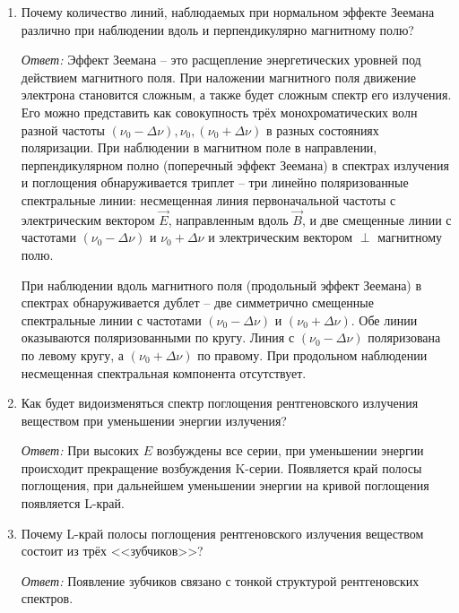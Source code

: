 \begin{enumerate}
\vspace*{1.5em}
\item Почему количество линий, наблюдаемых при нормальном эффекте Зеемана
различно при наблюдении вдоль и перпендикулярно магнитному полю?

\emph{Ответ:}
Эффект Зеемана -- это расщепление энергетических уровней под действием
магнитного поля. При наложении магнитного поля движение электрона становится
сложным, а также будет сложным спектр его излучения. Его можно представить как
совокупность трёх монохроматических волн разной частоты \( (\nu_0 - \Delta \nu),
\nu_0, (\nu_0 + \Delta \nu) \) в разных состояниях поляризации. При наблюдении в
магнитном поле в направлении, перпендикулярном полно (поперечный эффект Зеемана)
в спектрах излучения и поглощения обнаруживается триплет -- три линейно
поляризованные спектральные линии: несмещенная линия первоначальной частоты
с электрическим вектором \( \vec{E} \), направленным вдоль \( \vec{B} \), и две
смещенные линии с частотами \( (\nu_0 - \Delta \nu) \) и \( \nu_0 + \Delta \nu\)
и электрическим вектором \( \perp \) магнитному полю.

При наблюдении вдоль магнитного поля (продольный эффект Зеемана) в спектрах
обнаруживается дублет -- две симметрично смещенные спектральные линии с
частотами \( (\nu_0 - \Delta \nu) \) и \( (\nu_0 + \Delta \nu) \). Обе линии
оказываются поляризованными по кругу. Линия с \( (\nu_0 - \Delta \nu) \)
поляризована по левому кругу, а \( (\nu_0 + \Delta \nu) \) по правому. При
продольном наблюдении несмещенная спектральная компонента отсутствует.

\vspace*{1.5em}
\item Как будет видоизменяться спектр поглощения рентгеновского излучения
веществом при уменьшении энергии излучения?

\emph{Ответ:}
При высоких \( E \) возбуждены все серии, при уменьшении энергии происходит
прекращение возбуждения K-серии. Появляется край полосы поглощения, при
дальнейшем уменьшении энергии на кривой поглощения появляется L-край.

\vspace*{1.5em}
\item Почему L-край полосы поглощения рентгеновского излучения веществом
состоит из трёх <<зубчиков>>?

\emph{Ответ:}
Появление зубчиков связано с тонкой структурой рентгеновских спектров.


\end{enumerate}
